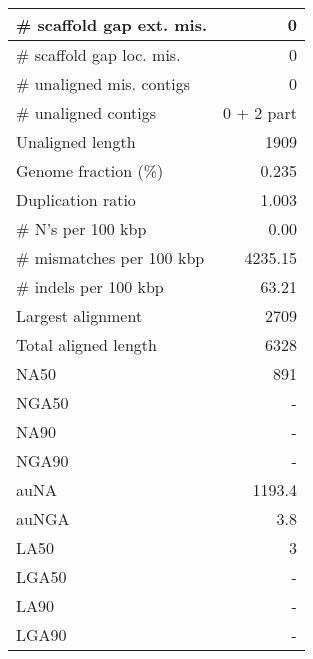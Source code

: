 \documentclass[12pt,a4paper]{article}
\begin{document}
\begin{table}[ht]
\begin{center}
\begin{tabular}{|l*{1}{|r}|}
\# scaffold gap ext. mis. & 0 \\ \hline
\# scaffold gap loc. mis. & 0 \\ \hline
\# unaligned mis. contigs & 0 \\ \hline
\# unaligned contigs & 0 + 2 part \\ \hline
Unaligned length & 1909 \\ \hline
Genome fraction (\%) & 0.235 \\ \hline
Duplication ratio & 1.003 \\ \hline
\# N's per 100 kbp & 0.00 \\ \hline
\# mismatches per 100 kbp & 4235.15 \\ \hline
\# indels per 100 kbp & 63.21 \\ \hline
Largest alignment & 2709 \\ \hline
Total aligned length & 6328 \\ \hline
NA50 & 891 \\ \hline
NGA50 & - \\ \hline
NA90 & - \\ \hline
NGA90 & - \\ \hline
auNA & 1193.4 \\ \hline
auNGA & 3.8 \\ \hline
LA50 & 3 \\ \hline
LGA50 & - \\ \hline
LA90 & - \\ \hline
LGA90 & - \\ \hline
\end{tabular}
\end{center}
\end{table}
\end{document}
